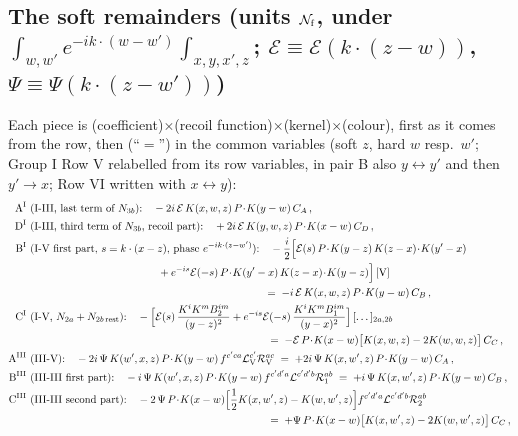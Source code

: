 {\subsection*{The soft remainders (units $\mathcal{N}_{\rm f}$, under $\int_{w,w'}e^{-ik\cdot(w-w')}\int_{x,y,x',z}$; $\mathcal{E}\equiv\mathcal{E}(k\cdot(z-w))$, $\Psi\equiv\Psi(k\cdot(z-w'))$)}
\noindent Each piece is (coefficient)$\times$(recoil function)$\times$(kernel)$\times$(colour), first as it comes from the row, then (``$=$'') in the common variables (soft $z$, hard $w$ resp.\ $w'$; Group I Row V relabelled from its row variables, in pair B also $y\leftrightarrow y'$ and then $y'\to x$; Row VI written with $x\leftrightarrow y$):
\begin{align}
\text{A}^{\rm I}\ &\text{(I-III, last term of $N_{3b}$):}\quad -2i\,\mathcal{E}\,K(x,w,z)\,P\!\cdot\!K(y-w)\,C_{A}\,,\notag\\
\text{D}^{\rm I}\ &\text{(I-III, third term of $N_{3b}$, recoil part):}\quad +2i\,\mathcal{E}\,K(y,w,z)\,P\!\cdot\!K(x-w)\,C_{D}\,,\notag\\
\text{B}^{\rm I}\ &\text{(I-V first part, $s=k\cdot(x-z)$, phase $e^{-ik\cdot(z-w')}$):}\quad-\frac{i}{2}\Big[\mathcal{E}(s)\,P\!\cdot\!K(y-z)\,K(z-x)\!\cdot\!K(y'-x)\notag\\&\hspace{12em}+e^{-is}\mathcal{E}(-s)\,P\!\cdot\!K(y'-x)\,K(z-x)\!\cdot\!K(y-z)\Big]\,[\text{V}]\notag\\
&\hspace{22em}=\;-i\,\mathcal{E}\,K(x,w,z)\,P\!\cdot\!K(y-w)\,C_{B}\,,\notag\\
\text{C}^{\rm I}\ &\text{(I-V, $N_{2a}+N_{2b\,\rm rest}$):}\quad-\Big[\mathcal{E}(s)\,\frac{K^{i}K^{m}B_{2}^{im}}{(y-z)^{2}}+e^{-is}\mathcal{E}(-s)\,\frac{K^{i}K^{m}B_{1}^{im}}{(y-x)^{2}}\Big]\,[\dots]_{2a,2b}\notag\\&\hspace{22em}\;=\;-\mathcal{E}\,P\!\cdot\!K(x-w)\big[K(x,w,z)-2K(w,w,z)\big]\,C_{C}\,,\notag\\
\text{A}^{\rm III}\ &\text{(III-V):}\quad-2i\,\Psi\,K(w',x,z)\,P\!\cdot\!K(y-w)\,f^{c'ca}\mathcal{L}_{\rm V}^{c'}\mathcal{R}_{\rm V}^{ac}\;=\;+2i\,\Psi\,K(x,w',z)\,P\!\cdot\!K(y-w)\,C_{A}\,,\label{eq:fx-pieces}\\
\text{B}^{\rm III}\ &\text{(III-III first part):}\quad-i\,\Psi\,K(w',x,z)\,P\!\cdot\!K(y-w)\,f^{c'd'a}\mathcal{L}^{c'd'b}\mathcal{R}_{1}^{ab}\;=\;+i\,\Psi\,K(x,w',z)\,P\!\cdot\!K(y-w)\,C_{B}\,,\notag\\
\text{C}^{\rm III}\ &\text{(III-III second part):}\quad-2\,\Psi\,P\!\cdot\!K(x-w)\Big[\frac12K(x,w',z)-K(w,w',z)\Big]f^{c'd'a}\mathcal{L}^{c'd'b}\mathcal{R}_{2}^{ab}\notag\\&\hspace{22em}\;=\;+\Psi\,P\!\cdot\!K(x-w)\big[K(x,w',z)-2K(w,w',z)\big]\,C_{C}\,,\notag\\

\end{align}}

